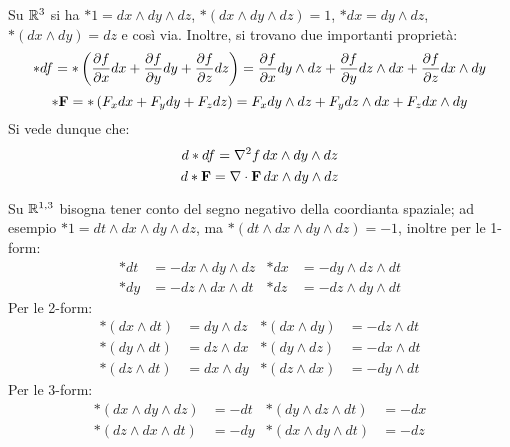 \begin{example}
	Su $ \mathbb{R}^3 $ si ha $ *1 = dx \wedge dy \wedge dz $, $ * \left( dx \wedge dy \wedge dz \right) = 1 $, $ *dx = dy \wedge dz $, $ * \left( dx \wedge dy \right) = dz $ e così via. Inoltre, si trovano due importanti proprietà:
	\begin{equation*}
		*df = * \left( \frac{\partial f}{\partial x}dx + \frac{\partial f}{\partial y}dy + \frac{\partial f}{\partial z}dz \right) = \frac{\partial f}{\partial x} dy \wedge dz + \frac{\partial f}{\partial y} dz \wedge dx + \frac{\partial f}{\partial z} dx \wedge dy
	\end{equation*}
	\begin{equation*}
		*\mathbf{F} = * \left( F_x dx + F_y dy + F_z dz \right) = F_x dy \wedge dz + F_y dz \wedge dx + F_z dx \wedge dy
	\end{equation*}
	Si vede dunque che:
	\begin{equation}
		d*df = \nabla^2 f \, dx \wedge dy \wedge dz
		\label{eq:3.19}
	\end{equation}
	\begin{equation}
		d*\mathbf{F} = \nabla\cdot\mathbf{F} \, dx \wedge dy \wedge dz
		\label{eq:3.20}
	\end{equation}
\end{example}
\begin{example}
	Su $ \mathbb{R}^{1,3} $ bisogna tener conto del segno negativo della coordianta spaziale; ad esempio $ *1 = dt \wedge dx \wedge dy \wedge dz $, ma $ * \left( dt \wedge dx \wedge dy \wedge dz \right) = -1 $, inoltre per le 1-form:
	\begin{align*}
		*dt &= - dx \wedge dy \wedge dz & *dx &= - dy \wedge dz \wedge dt \\
		*dy &= - dz \wedge dx \wedge dt & *dz &= - dz \wedge dy \wedge dt
	\end{align*}
	Per le 2-form:
	\begin{align*}
		*(dx \wedge dt) &= dy \wedge dz & *(dx \wedge dy) &= - dz \wedge dt \\
		*(dy \wedge dt) &= dz \wedge dx & *(dy \wedge dz) &= - dx \wedge dt \\
		*(dz \wedge dt) &= dx \wedge dy & *(dz \wedge dx) &= - dy \wedge dt
	\end{align*}
	Per le 3-form:
	\begin{align*}
		*(dx \wedge dy \wedge dz) &= - dt & *(dy \wedge dz \wedge dt) &= -dx \\
		*(dz \wedge dx \wedge dt) &= - dy & *(dx \wedge dy \wedge dt) &= -dz
	\end{align*}
\end{example}

